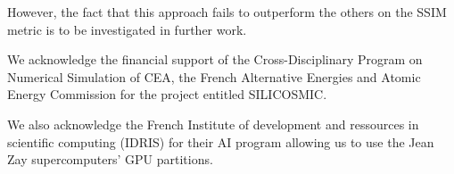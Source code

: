 \documentclass{article}
\begin{document}
However, the fact that this approach fails to outperform the others on the SSIM metric is to be investigated in further work.


\begin{ack}
We acknowledge the financial support of the Cross-Disciplinary Program on Numerical Simulation of CEA, the French Alternative Energies and Atomic Energy Commission for the project entitled SILICOSMIC.

We also acknowledge the French Institute of development and ressources in scientific computing (IDRIS) for their AI program allowing us to use the Jean Zay supercomputers' GPU partitions.
\end{ack}



\medskip





\end{document}
